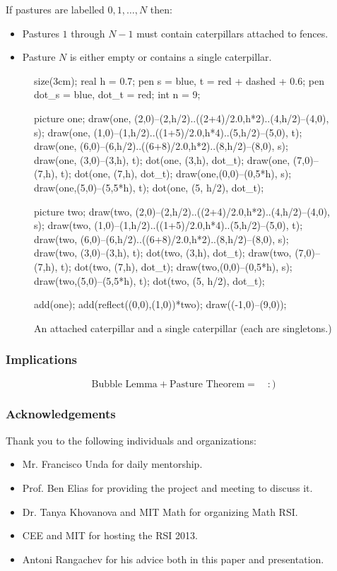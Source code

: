 \documentclass[pdf]{beamer}
\def\ii{\item}
\theoremstyle{definition}
\begin{document}
\begin{frame}[fragile]

	\begin{theorem}
		 If pastures are labelled $0, 1, \dots, N$ then:
		\begin{itemize}
			\ii Pastures $1$ through $N-1$ must contain caterpillars attached to fences.
			\ii Pasture $N$ is either empty or contains a single caterpillar.
		\end{itemize}
	\end{theorem}

	\begin{figure}[ht]
		\centering
		\begin{asy}
			size(3cm);
real h = 0.7;
pen s = blue, t = red + dashed + 0.6;
pen dot_s = blue, dot_t = red;
int n = 9;

picture one;
draw(one, (2,0)--(2,h/2)..((2+4)/2.0,h*2)..(4,h/2)--(4,0), s);
draw(one, (1,0)--(1,h/2)..((1+5)/2.0,h*4)..(5,h/2)--(5,0), t);
draw(one, (6,0)--(6,h/2)..((6+8)/2.0,h*2)..(8,h/2)--(8,0), s);
draw(one, (3,0)--(3,h), t);
dot(one, (3,h), dot_t);
draw(one, (7,0)--(7,h), t);
dot(one, (7,h), dot_t);
draw(one,(0,0)--(0,5*h), s);
draw(one,(5,0)--(5,5*h), t);
dot(one, (5, h/2), dot_t);

picture two;
draw(two, (2,0)--(2,h/2)..((2+4)/2.0,h*2)..(4,h/2)--(4,0), s);
draw(two, (1,0)--(1,h/2)..((1+5)/2.0,h*4)..(5,h/2)--(5,0), t);
draw(two, (6,0)--(6,h/2)..((6+8)/2.0,h*2)..(8,h/2)--(8,0), s);
draw(two, (3,0)--(3,h), t);
dot(two, (3,h), dot_t);
draw(two, (7,0)--(7,h), t);
dot(two, (7,h), dot_t);
draw(two,(0,0)--(0,5*h), s);
draw(two,(5,0)--(5,5*h), t);
dot(two, (5, h/2), dot_t);

add(one); add(reflect((0,0),(1,0))*two);
draw((-1,0)--(9,0));
		\end{asy}
		\caption{An attached caterpillar and a single caterpillar (each are singletons.)}
	\end{figure}

\end{frame}

\begin{frame}
	\frametitle{Implications}
	\[ \text{Bubble Lemma} + \text{Pasture Theorem} = \quad :{)} \]
\end{frame}

\begin{frame}
	\frametitle{Acknowledgements}
	Thank you to the following individuals and organizations:
	\begin{itemize}
		\ii Mr. Francisco Unda for daily mentorship.
		\ii Prof. Ben Elias for providing the project and meeting to discuss it.
		\ii Dr. Tanya Khovanova and MIT Math for organizing Math RSI.
		\ii CEE and MIT for hosting the RSI 2013.
		\ii Antoni Rangachev for his advice both in this paper and presentation.
	\end{itemize}
\end{frame}
\end{document}
